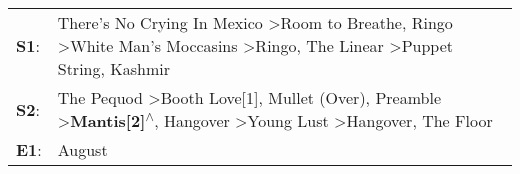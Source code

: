 \begin{supertabular}{p{0.03\textwidth}p{0.92\textwidth}}
 \textbf{S1}:  &                                 There's No Crying In Mexico\textsuperscript{} \textgreater \enspace Room to Breathe\textsuperscript{}, \enspace Ringo\textsuperscript{} \textgreater \enspace White Man's Moccasins\textsuperscript{} \textgreater \enspace Ringo\textsuperscript{}, \enspace The Linear\textsuperscript{} \textgreater \enspace Puppet String\textsuperscript{}, \enspace Kashmir\textsuperscript{}  \enspace  \\
 \textbf{S2}:  &  The Pequod\textsuperscript{} \textgreater \enspace Booth Love[1]\textsuperscript{}, \enspace Mullet (Over)\textsuperscript{}, \enspace Preamble\textsuperscript{} \textgreater \enspace \textbf{Mantis[2]\textsuperscript{$\wedge$}}, \enspace Hangover\textsuperscript{} \textgreater \enspace Young Lust\textsuperscript{} \textgreater \enspace Hangover\textsuperscript{}, \enspace The Floor\textsuperscript{}  \enspace  \\
 \textbf{E1}:  &                                                                                                                                                                                                                                                                                                                                                                                             August\textsuperscript{}  \enspace  \\
\end{supertabular}
